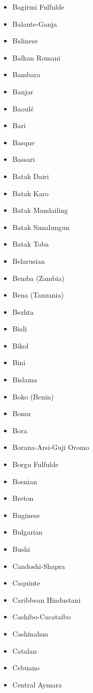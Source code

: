 \documentclass[paper=a4, 10pt]{scrbook}
\begin{document}
\begin{multicols}{3}
\begin{itemize}
        \item Bagirmi Fulfulde
        \item Balante-Ganja
        \item Balinese
        \item Balkan Romani
        \item Bambara
        \item Banjar
        \item Baoulé
        \item Bari
        \item Basque
        \item Bassari
        \item Batak Dairi
        \item Batak Karo
        \item Batak Mandailing
        \item Batak Simalungun
        \item Batak Toba
        \item Belarusian
        \item Bemba (Zambia)
        \item Bena (Tanzania)
        \item Bezhta
        \item Biali
        \item Bikol
        \item Bini
        \item Bislama
        \item Boko (Benin)
        \item Bomu
        \item Bora
        \item Borana-Arsi-Guji Oromo
        \item Borgu Fulfulde
        \item Bosnian
        \item Breton
        \item Buginese
        \item Bulgarian
        \item Bushi
        \item Candoshi-Shapra
        \item Caquinte
        \item Caribbean Hindustani
        \item Cashibo-Cacataibo
        \item Cashinahua
        \item Catalan
        \item Cebuano
        \item Central Aymara

\end{itemize}
\end{multicols}
\end{document}

